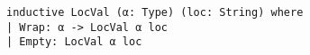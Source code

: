 \begin{lstlisting}[language=lean]
inductive LocVal (α: Type) (loc: String) where
| Wrap: α -> LocVal α loc
| Empty: LocVal α loc
\end{lstlisting}
